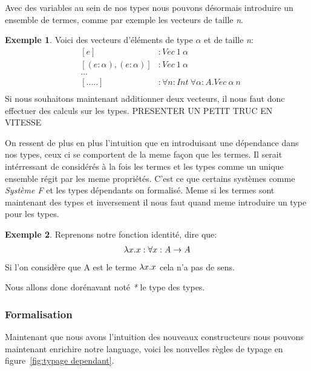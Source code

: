 \documentclass {article}
\theoremstyle{definition}
\newtheorem{example}{Exemple}
\theoremstyle{remark}
\begin{document}
Avec des variables au sein de nos types nous pouvons désormais introduire un ensemble de termes, 
comme par exemple les vecteurs de taille \emph{n}.
\begin{example}  
  \label{example vecteur}
  Voici des vecteurs d'éléments de type $\alpha$ et de taille \emph{n}:
  \begin{align*}
    &[e] &: Vec\: 1\: \alpha \\
    &[(e:\alpha),(e:\alpha)] &: Vec\: 1\: \alpha \\
    &... \\
    &[.....] &: \forall n:Int\: \forall \alpha : A . Vec\: \alpha \: n \\
  \end{align*}
  Si nous souhaitons maintenant additionner deux vecteurs, il nous faut donc effectuer des calculs sur les types.
  PRESENTER UN PETIT TRUC EN VITESSE
\end{example}
On ressent de plus en plus l'intuition que en introduisant une dépendance dans nos types, ceux ci se comportent de la meme façon que 
les termes.
Il serait intérressant de considérés à la fois les termes et les types comme un unique ensemble régit par les meme propriétés.
C'est ce que certains systèmes comme \emph{Système F} et les types dépendants on formalisé. 
Meme si les termes sont maintenant des types et inversement il nous faut quand meme introduire un type pour les types.
\begin{example}
  Reprenons notre fonction identité, dire que:
  \begin{align*}
    \lambda x. x : \forall x:A \rightarrow A
  \end{align*}
  Si l'on considère que A est le terme $\lambda x. x$ cela n'a pas de sens.
\end{example}
Nous allons donc dorénavant noté \emph{*} le type des types.

\subsubsection{Formalisation}

Maintenant que nous avons l'intuition des nouveaux constructeurs nous pouvons maintenant enrichire notre language,
voici les nouvelles règles de typage en figure~\ref{fig:typage dependant}.
\end{document}
